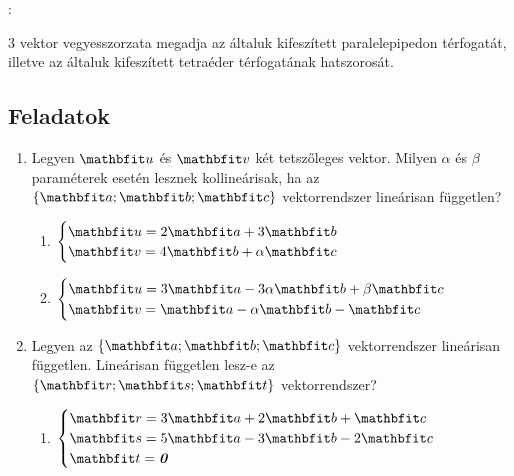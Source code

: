 \documentclass[a4paper, 12pt]{scrartcl}
\begin{document}
\begin{note}
  :

  3 vektor vegyesszorzata megadja az általuk kifeszített paralelepipedon
  térfogatát, illetve az általuk kifeszített tetraéder térfogatának hatszorosát.
\end{note}

\clearpage
\subsection{Feladatok}

\begin{enumerate}
  \item Legyen $\rvec u$ és $\rvec v$ két tetszőleges vektor. Milyen $\alpha$ és
        $\beta$ paraméterek esetén lesznek kollineárisak, ha az $\{ \rvec a;
          \rvec b; \rvec c \}$ vektorrendszer lineárisan független?
        \begin{multicols}{2}
          \begin{enumerate}
            \item $
                    \begin{cases}
                      \rvec u = 2 \rvec a + 3 \rvec b \\
                      \rvec v = 4 \rvec b + \alpha \rvec c
                    \end{cases}
                  $

            \item $
                    \begin{cases}
                      \rvec u = 3 \rvec a - 3 \alpha \rvec b + \beta \rvec c \\
                      \rvec v = \rvec a - \alpha \rvec b - \rvec c
                    \end{cases}
                  $
          \end{enumerate}
        \end{multicols}

  \item Legyen az $\{ \rvec a; \rvec b; \rvec c \}$ vektorrendszer lineárisan
        független. Lineárisan független lesz-e az $\{ \rvec r; \rvec s;
          \rvec t \}$ vektorrendszer?
        \begin{multicols}{2}
          \begin{enumerate}
            \item $
                    \begin{cases}
                      \rvec r = 3 \rvec a + 2 \rvec b +   \rvec c \\
                      \rvec s = 5 \rvec a - 3 \rvec b - 2 \rvec c \\
                      \rvec t = \nvec
                    \end{cases}
                  $


\end{enumerate}
\end{multicols}
\end{enumerate}
\end{document}
